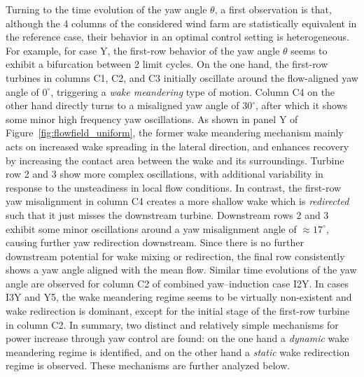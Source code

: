 	Turning to the time evolution of the yaw angle $\theta$, a first observation is that, although the 4 columns of the considered wind farm are statistically equivalent in the reference case, their behavior in an optimal control setting is heterogeneous. For example, for case Y, the first-row behavior of the yaw angle $\theta$ seems to exhibit a bifurcation between 2 limit cycles. On the one hand, the first-row turbines in columns C1, C2, and C3 initially oscillate around the flow-aligned yaw angle of $0^\circ$, triggering a \emph{wake meandering} type of motion. Column C4 on the other hand directly turns to a misaligned yaw angle of $30^\circ$, after which it shows some minor high frequency yaw oscillations. As shown in panel Y of Figure~\ref{fig:flowfield_uniform}, the former wake meandering mechanism mainly acts on increased wake spreading in the lateral direction, and enhances recovery by increasing the contact area between the wake and its surroundings. Turbine row 2 and 3 show more complex oscillations, with additional variability in response to the unsteadiness in local flow conditions. In contrast, the first-row yaw misalignment in column C4 creates a more shallow wake which is \emph{redirected} such that it just misses the downstream turbine. Downstream rows 2 and 3 exhibit some minor oscillations around a yaw misalignment angle of $\approx 17^\circ$, causing further yaw redirection downstream. Since there is no further downstream potential for wake mixing or redirection, the final row consistently shows a yaw angle aligned with the mean flow. Similar time evolutions of the yaw angle are observed for column C2 of combined yaw--induction case I2Y. In cases I3Y and Y5, the wake meandering regime seems to be virtually non-existent and wake redirection is dominant, except for the initial stage of the first-row turbine in column C2. In summary, two distinct and relatively simple mechanisms for power increase through yaw control are found: on the one hand a \emph{dynamic} wake meandering regime is identified, and on the other hand a \emph{static} wake redirection regime is observed. These mechanisms are further analyzed below.
	
